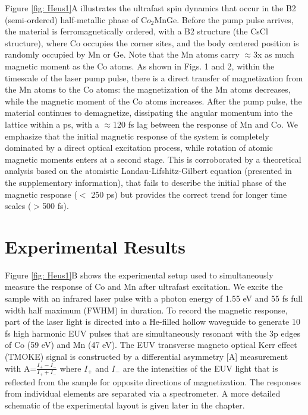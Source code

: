 Figure \ref{fig: Heus1}A illustrates the ultrafast spin dynamics that occur in the B2 (semi-ordered) half-metallic phase of C$o_2$MnGe. Before the pump pulse arrives, the material is ferromagnetically ordered, with a B2 structure (the CsCl structure), where Co occupies the corner sites, and the body centered position is randomly occupied by Mn or Ge. Note that the Mn atoms carry $\approx$3x as much magnetic moment as the Co atoms. As shown in Figs. 1 and 2, within the timescale of the laser pump pulse, there is a direct transfer of magnetization from the Mn atoms to the Co atoms: the magnetization of the Mn atoms decreases, while the magnetic moment of the Co atoms increases. After the pump pulse, the material continues to demagnetize, dissipating the angular momentum into the lattice within a ps, with a $\approx$120 fs lag between the response of Mn and Co. We emphasize that the initial magnetic response of the system is completely dominated by a direct optical excitation process, while rotation of atomic magnetic moments enters at a second stage. This is corroborated by a theoretical analysis based on the atomistic Landau-Lifshitz-Gilbert equation \cite{Ericksson2017} (presented in the supplementary information), that fails to describe the initial phase of the magnetic response ($<$ 250 ps) but provides the correct trend for longer time scales ($>$500 fs).

\section{Experimental Results}
Figure \ref{fig: Heus1}B shows the experimental setup used to simultaneously measure the response of Co and Mn after ultrafast excitation. We excite the sample with an infrared laser pulse with a photon energy of 1.55 eV and 55 fs full width half maximum (FWHM) in duration. To record the magnetic response, part of the laser light is directed into a He-filled hollow waveguide to generate 10 fs high harmonic EUV pulses that are simultaneously resonant with the 3p edges of Co (59 eV) and Mn (47 eV). The EUV transverse magneto optical Kerr effect (TMOKE) signal is constructed by a differential asymmetry [A] measurement with A=$\frac{I_+ - I_-}{I_+ + I_-}$ where $I_+$ and $I_-$ are the intensities of the EUV light that is reflected from the sample for opposite directions of magnetization. The responses from individual elements are separated via a spectrometer. A more detailed schematic of the experimental layout is given later in the chapter.

